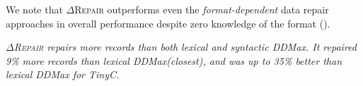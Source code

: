 \documentclass[sigconf,review,anonymous]{acmart}
\makeatletter
\newenvironment{result}{\begin{framed}\centering\it}{\end{framed}}
\newcommand{\formatdependent}{format-dependent\xspace}
\newcommand{\dtask}{data repair\xspace}
\def\Rincomplete{\texttt{\color{incompletecolor}\textbf{$\vartriangleright$}}\xspace}
\def\Rvalid{\texttt{\color{validcolor}\textbf{$\checkmark$}}\xspace}
\newcommand{\approach}{\textsc{$\Delta$Repair}\xspace}
\newcommand{\ddmax}{\textit{DDMax}\xspace}
\newcommand{\drepair}{\approach}
\newcommand\letterboxed[1]{%
\setlength{\fboxsep}{0pt}%
  \@tfor\@ii:=#1\do{%
    \fcolorbox{light-gray}{white}%
    {\texttt{\strut\@ii}}%
  }%
}
\makeatother
\begin{document}
%
%


% 


We note that \drepair outperforms even the \emph{\formatdependent} \dtask approaches
in overall performance despite zero knowledge of the format
().
% 


\begin{result}
\drepair repairs more records than both lexical and syntactic \ddmax.
It repaired 9\% more records than lexical \ddmax (closest), and was
up to 35\% better than lexical \ddmax for TinyC.
\end{result}
\end{document}
